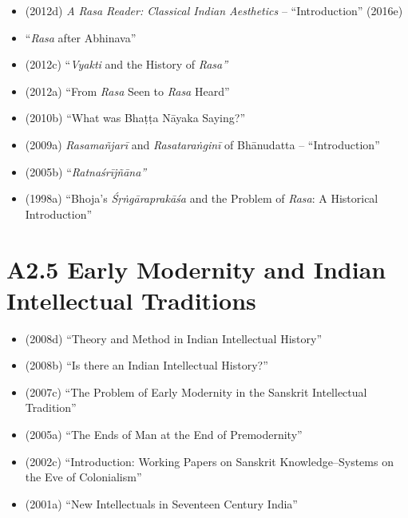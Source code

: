 \begin{itemize}
\item (2012d) \textit{A Rasa Reader: Classical Indian Aesthetics} – “Introduction” (2016e)

 \item “\textit{Rasa} after Abhinava”

 \item (2012c) “\textit{Vyakti} and the History of \textit{Rasa”}

 \item (2012a) “From \textit{Rasa} Seen to \textit{Rasa} Heard”

 \item (2010b) “What was Bhaṭṭa Nāyaka Saying?”

 \item (2009a) \textit{Rasamañjarī} and \textit{Rasataraṅginī} of Bhānudatta – “Introduction”

 \item (2005b) “\textit{Ratnaśrījñāna”}

 \item (1998a) “Bhoja's \textit{Śṛṅgāraprakāśa} and the Problem of \textit{Rasa}: A Historical Introduction”

\end{itemize}


\section*{A2.5 Early Modernity and Indian Intellectual Traditions}

\begin{itemize}
\item (2008d) “Theory and Method in Indian Intellectual History”

 \item (2008b) “Is there an Indian Intellectual History?”

 \item (2007c) “The Problem of Early Modernity in the Sanskrit Intellectual Tradition”

 \item (2005a) “The Ends of Man at the End of Premodernity”

 \item (2002c) “Introduction: Working Papers on Sanskrit Knowledge–Systems on the Eve of Colonialism”

 \item (2001a) “New Intellectuals in Seventeen Century India”

\end{itemize}


